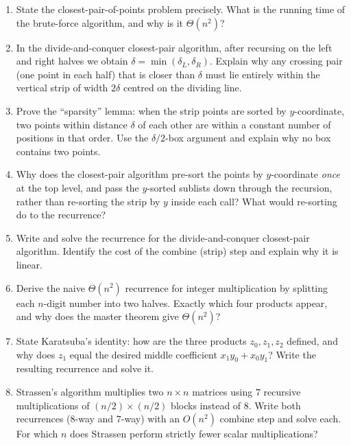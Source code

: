 \documentclass[11pt]{article}
\begin{document}
\begin{enumerate}[label=\textbf{A\arabic*.}, leftmargin=2.2em]

\item State the closest-pair-of-points problem precisely. What is the running time of the
brute-force algorithm, and why is it $\Theta(n^2)$?

\item In the divide-and-conquer closest-pair algorithm, after recursing on the left and right
halves we obtain $\delta = \min(\delta_L, \delta_R)$. Explain why any crossing pair (one point
in each half) that is closer than $\delta$ must lie entirely within the vertical strip of
width $2\delta$ centred on the dividing line.

\item Prove the ``sparsity'' lemma: when the strip points are sorted by $y$-coordinate, two
points within distance $\delta$ of each other are within a constant number of positions in
that order. Use the $\delta/2$-box argument and explain why no box contains two points.

\item Why does the closest-pair algorithm pre-sort the points by $y$-coordinate \emph{once} at
the top level, and pass the $y$-sorted sublists down through the recursion, rather than
re-sorting the strip by $y$ inside each call? What would re-sorting do to the recurrence?

\item Write and solve the recurrence for the divide-and-conquer closest-pair algorithm.
Identify the cost of the combine (strip) step and explain why it is linear.

\item Derive the naive $\Theta(n^2)$ recurrence for integer multiplication by splitting each
$n$-digit number into two halves. Exactly which four products appear, and why does the master
theorem give $\Theta(n^2)$?

\item State Karatsuba's identity: how are the three products $z_0, z_1, z_2$ defined, and why
does $z_1$ equal the desired middle coefficient $x_1 y_0 + x_0 y_1$? Write the resulting
recurrence and solve it.

\item Strassen's algorithm multiplies two $n \times n$ matrices using $7$ recursive
multiplications of $(n/2) \times (n/2)$ blocks instead of $8$. Write both recurrences ($8$-way
and $7$-way) with an $O(n^2)$ combine step and solve each. For which $n$ does Strassen perform
strictly fewer scalar multiplications?


\end{enumerate}
\end{document}
